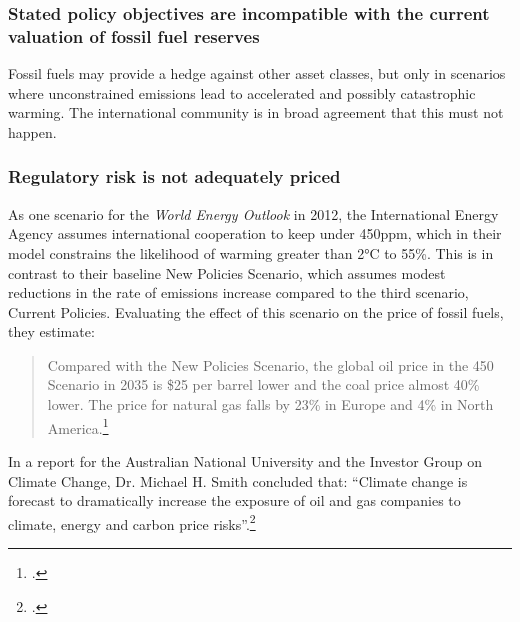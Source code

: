 	\subsubsection {Stated policy objectives are incompatible with the current valuation of fossil fuel reserves}



Fossil fuels may provide a hedge against other asset classes, but only in scenarios where unconstrained emissions lead to accelerated and possibly catastrophic warming. 
The international community is in broad agreement that this must not happen.



	\subsubsection {Regulatory risk is not adequately priced} 



As one scenario for the \emph{World Energy Outlook} in 2012, the International Energy Agency assumes international cooperation to keep  under 450ppm, which in their model constrains the likelihood of warming greater than 2°C to 55\%. 
This is in contrast to their baseline New Policies Scenario, which assumes modest reductions in the rate of emissions increase compared to the third scenario, Current Policies. 
Evaluating the effect of this scenario on the price of fossil fuels, they estimate:
\begin{quote}
Compared with the New Policies Scenario, the global oil price in the 450 Scenario in 2035 is \$25 per barrel lower and the coal price almost 40\% lower. The price for natural gas falls by 23\% in Europe and 4\% in North America.\footcite[][p. 257]{IEA2012}
\end{quote}
In a report for the Australian National University and the Investor Group on Climate Change, Dr. Michael H. Smith concluded that: ``Climate change is forecast to dramatically increase the exposure of oil and gas companies to climate, energy and carbon price risks''.\footcite[][p. 14]{RisksForInvestors}



